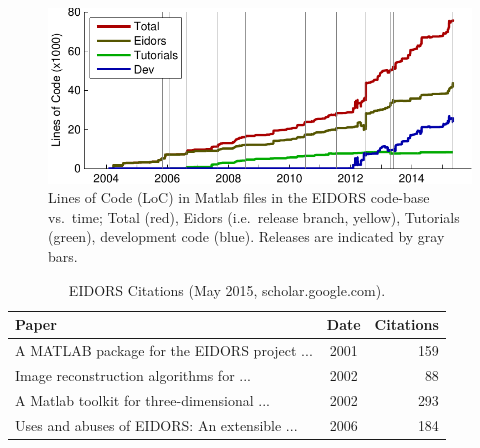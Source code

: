 \documentclass[portrait,final,a0paper,fontscale=0.277]{baposter}
\begin{document}
\begin{poster}
{\begin{figure}[H]
\centering
\includegraphics[width=.9\columnwidth]{../fig_loc.pdf}
\caption{\label{fig:loc}%
  \large
  Lines of Code (LoC) in Matlab files in the EIDORS code-base vs.\ time; Total
   (red), Eidors (i.e.\ release branch, yellow), Tutorials (green), development code (blue).
   Releases are indicated by gray bars.
}
\end{figure}

\begin{table}[H]
\centering
\caption{\large\label{tbl:cite} EIDORS Citations
 (May 2015, scholar.google.com).
}
\begin{tabular}{lcr}
  \toprule
  Paper & Date & \hspace{-2mm}Citations \\
  \midrule
  \cite{vauhkonen2001} A MATLAB package for the EIDORS project {\tiny ...}  
    & 2001 & 159 \\
  \cite{polydorides2002phd} Image reconstruction algorithms for {\tiny ...}  
    & 2002 & 88 \\
  \cite{polydorides2002matlab} A Matlab toolkit for three-dimensional {\tiny ...}  
    & 2002 & 293 \\
  \cite{adler2006} Uses and abuses of {EIDORS}: An extensible {\tiny ...} 
    & 2006 & 184 \\
  \bottomrule
\end{tabular}
\vspace{-1em}
\end{table}
   \vspace{0.3em}
}


\end{poster}
\end{document}
